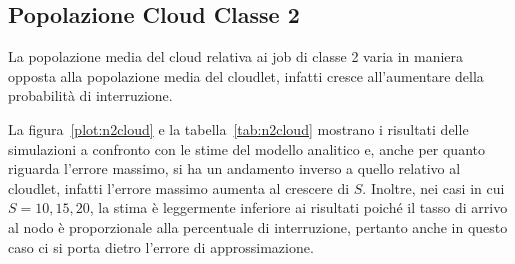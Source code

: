 \subsection{Popolazione Cloud Classe 2}
La popolazione media del cloud relativa ai job di classe 2 varia in maniera
opposta alla popolazione media del cloudlet, infatti cresce all'aumentare della
probabilità di interruzione. 

La figura~\ref{plot:n2cloud} e la tabella~\ref{tab:n2cloud} mostrano i risultati
delle simulazioni a confronto con le stime del modello analitico e, anche per
quanto riguarda l'errore massimo, si ha un andamento inverso a quello relativo
al cloudlet, infatti l'errore massimo aumenta al crescere di $S$. Inoltre, nei
casi in cui $S=10,15,20$, la stima è leggermente inferiore ai risultati poiché
il tasso di arrivo al nodo è proporzionale alla percentuale di interruzione,
pertanto anche in questo caso ci si porta dietro l'errore di approssimazione.
